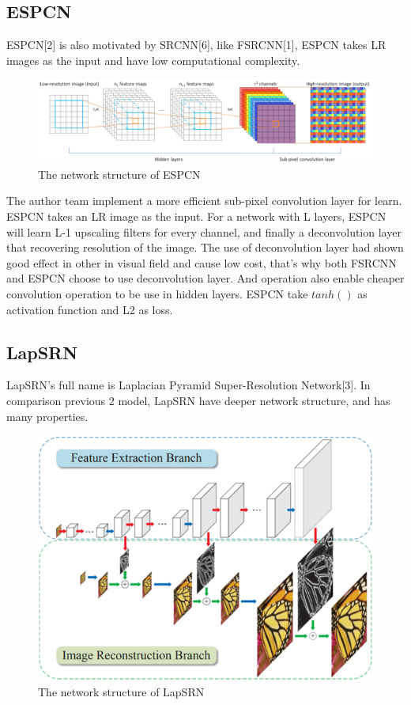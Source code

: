 \documentclass[10pt,twocolumn,letterpaper]{article}
\begin{document}
\subsection{ESPCN}
ESPCN[2] is also motivated by SRCNN[6], like FSRCNN[1], ESPCN takes LR images as the input and have low computational complexity. 
\begin{figure}[H]
    \centering
    \includegraphics[scale = 0.4]{images/ESPCN.png}
    \caption{The network structure of ESPCN}
\end{figure}
The author team implement a more efficient sub-pixel convolution layer for learn. ESPCN takes an LR image as the input. For a network with L layers, ESPCN will learn L-1 upscaling filters for every channel, and finally a deconvolution layer that recovering resolution of the image. The use of deconvolution layer had shown good effect in other in visual field and cause low cost, that’s why both FSRCNN and ESPCN choose to use deconvolution layer. And operation also enable cheaper convolution operation to be use in hidden layers.
ESPCN take $tanh()$ as activation function and L2 as loss.

\subsection{LapSRN}
LapSRN's full name is Laplacian Pyramid Super-Resolution Network[3]. 
In comparison previous 2 model, LapSRN have deeper network structure, and has many properties. 
\begin{figure}[H]
    \centering
    \includegraphics[scale = 0.4]{images/LapSRN.png}
    \caption{The network structure of LapSRN}
\end{figure} 
\end{document}
